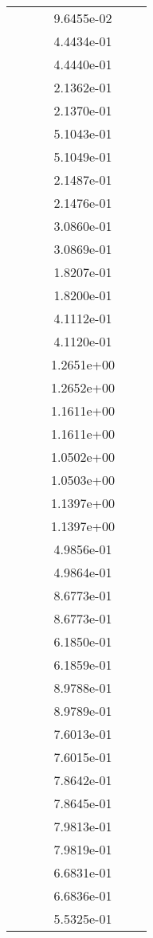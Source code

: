 \begin{xltabular}{\textwidth}{r|rS[table-format=1.3e+2]S[table-format=1.4e+2]S[table-format=1.4e+2]S[table-format=-1.5]}
&  &  & 9.6455e-02 & & \\
&  &  & 4.4434e-01 & & \\
&  &  & 4.4440e-01 & & \\
&  &  & 2.1362e-01 & & \\
&  &  & 2.1370e-01 & & \\
&  &  & 5.1043e-01 & & \\
&  &  & 5.1049e-01 & & \\
&  &  & 2.1487e-01 & & \\
&  &  & 2.1476e-01 & & \\
&  &  & 3.0860e-01 & & \\
&  &  & 3.0869e-01 & & \\
&  &  & 1.8207e-01 & & \\
&  &  & 1.8200e-01 & & \\
&  &  & 4.1112e-01 & & \\
&  &  & 4.1120e-01 & & \\
&  &  & 1.2651e+00 & & \\
&  &  & 1.2652e+00 & & \\
&  &  & 1.1611e+00 & & \\
&  &  & 1.1611e+00 & & \\
&  &  & 1.0502e+00 & & \\
&  &  & 1.0503e+00 & & \\
&  &  & 1.1397e+00 & & \\
&  &  & 1.1397e+00 & & \\
&  &  & 4.9856e-01 & & \\
&  &  & 4.9864e-01 & & \\
&  &  & 8.6773e-01 & & \\
&  &  & 8.6773e-01 & & \\
&  &  & 6.1850e-01 & & \\
&  &  & 6.1859e-01 & & \\
&  &  & 8.9788e-01 & & \\
&  &  & 8.9789e-01 & & \\
&  &  & 7.6013e-01 & & \\
&  &  & 7.6015e-01 & & \\
&  &  & 7.8642e-01 & & \\
&  &  & 7.8645e-01 & & \\
&  &  & 7.9813e-01 & & \\
&  &  & 7.9819e-01 & & \\
&  &  & 6.6831e-01 & & \\
&  &  & 6.6836e-01 & & \\
&  &  & 5.5325e-01 & & \\

\end{xltabular}

